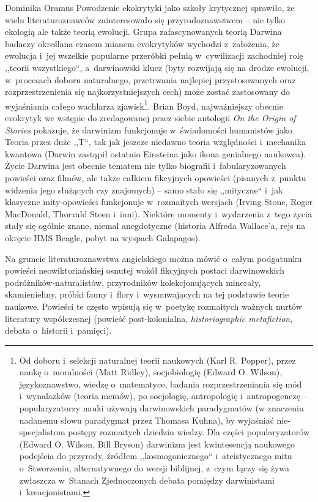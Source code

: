 \begin{artplenv}{Dominika Oramus}
Powodzenie ekokrytyki jako szkoły krytycznej sprawiło, że wielu literaturoznawców zainteresowało się przyrodoznawstwem -- nie tylko ekologią ale także teorią ewolucji. Grupa zafascynowanych teorią Darwina badaczy określana czasem mianem evokrytyków
\parencite[][s.~1–2]{boyd_origin_2010} %
 wychodzi z~założenia, że ewolucja i~jej wszelkie popularne przeróbki pełnią w~cywilizacji zachodniej rolę ,,teorii wszystkiego``, a~darwinowski klucz (byty rozwijają się na drodze ewolucji, w~procesach doboru naturalnego, przetrwania najlepiej przystosowanych oraz rozprzestrzenienia się najkorzystniejszych cech) może zostać zastosowany do wyjaśniania całego wachlarza zjawisk\footnote{Od doboru i~selekcji naturalnej teorii naukowych (Karl R. Popper), przez naukę o~moralności (Matt Ridley), socjobiologię (Edward O. Wilson), językoznawstwo, wiedzę o~matematyce, badania rozprzestrzeniania się mód i~wynalazków (teoria memów), po socjologię, antropologię i~antropogenezę -- popularyzatorzy nauki używają darwinowskich paradygmatów (w znaczeniu nadanemu słowu paradygmat przez Thomasa Kuhna), by wyjaśniać nie-specjalistom postępy rozmaitych dziedzin wiedzy. Dla części popularyzatorów (Edward O. Wilson, Bill Bryson) darwinizm jest kwintesencją naukowego podejścia do przyrody, źródłem ,,kosmogonicznego`` i~ateistycznego mitu o~Stworzeniu, alternatywnego do wersji biblijnej, z~czym łączy się żywa zwłaszcza w~Stanach Zjednoczonych debata pomiędzy darwinistami i~kreacjonistami.}. Brian Boyd, najważniejszy obecnie evokrytyk we wstępie do zredagowanej przez siebie antologii \textit{On the Origin of Stories} pokazuje, że darwinizm funkcjonuje w~świadomości humanistów jako Teoria przez duże ,,T``, tak jak jeszcze niedawno teoria względności i~mechanika kwantowa (Darwin zastąpił ostatnio Einsteina jako ikona genialnego naukowca). Życie Darwina jest obecnie tematem nie tylko biografii i~fabularyzowanych powieści oraz filmów, ale także całkiem fikcyjnych opowieści (pisanych z~punktu widzenia jego służących czy znajomych) -- samo stało się ,,mityczne`` i~jak klasyczne mity-opowieści funkcjonuje w~rozmaitych wersjach (Irving Stone, Roger MacDonald, Thorvald Steen i~inni). Niektóre momenty i~wydarzenia z~tego życia stały się ogólnie znane, niemal anegdotyczne (historia Alfreda Wallace’a, rejs na okręcie HMS Beagle, pobyt na wyspach Galapagos).

Na gruncie literaturoznawstwa angielskiego można mówić o~całym podgatunku powieści neowiktoriańskiej osnutej wokół fikcyjnych postaci darwinowskich podróżników-naturalistów, przyrodników kolekcjonujących minerały, skamienieliny, próbki fauny i~flory i~wysnuwających na tej podstawie teorie naukowe. Powieści te często wpisują się w~poetykę rozmaitych ważnych nurtów literatury współczesnej (powieść post-kolonialna, \textit{historiographic metafiction}, debata o~historii i~pamięci).


\end{artplenv}
